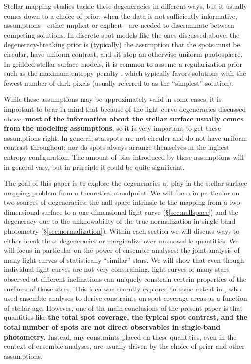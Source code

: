 \documentclass[modern]{aastex62}
\begin{document}
Stellar mapping studies tackle these degeneracies in different ways, but
it usually comes down to a choice of prior: when the data is not
sufficiently informative, assumptions---either implicit or explicit---are needed to discriminate
between competing solutions. In discrete spot models like the ones
discussed above, the degeneracy-breaking prior is (typically) the assumption that the
spots must be circular, have uniform contrast, and sit atop an otherwise
uniform photosphere. In gridded stellar surface models, it is common to
assume a regularization prior such as the maximum entropy penalty
\citep[e.g.,][]{Vogt1987}, which typically favors solutions with the fewest
number of dark pixels (usually referred to as the ``simplest'' solution).

While these assumptions may be approximately valid in some cases, it is
important to bear in mind that because of the light curve degeneracies discussed above,
\textbf{most of the information about the stellar surface usually comes from the modeling assumptions},
so it is very important to get these assumptions right. In general, starspots are not circular and do not have uniform
contrast throughout; nor do spots always arrange themselves in the highest
entropy configuration. The amount of bias introduced by these assumptions
will in general vary, but in principle it could be quite significant.


The goal of this paper is to explore the degeneracies at play in the
stellar surface mapping problem from a theoretical standpoint.
We will focus in particular on two sources of degeneracies: the
null space intrinsic to the mapping from a two-dimensional surface to
a one-dimensional light curve (\S\ref{sec:nullspace})
and the degeneracy due to the unknowability of the true normalization in
single-band photometry (\S\ref{sec:normalization}). Within each section we
will discuss ways to either break these degeneracies or marginalize
over unknowable quantities.
We will focus in particular on the power of ensemble analyses: the
joint analysis of many light curves of statistically ``similar''
stars. We will show that even though individual light curves are not very
constraining, light curves of many stars
observed at different inclinations can uniquely constrain certain
properties of the surfaces of those stars.
%
This idea was recently explored to some extent
in \citet{Morris2020}, who used ensemble analyses to derive constraints on
spot coverage areas as a function of stellar age. However, one of
the main conclusions of the present paper is that
quantities like \textbf{the
    total spot coverage, the typical spot contrast, and the total number of
    spots are not direct observables in single-band photometry.} Instead,
any constraints placed on these quantities, even in the context of
ensemble analyses, are usually driven by the choice of prior and other assumptions.
\end{document}
